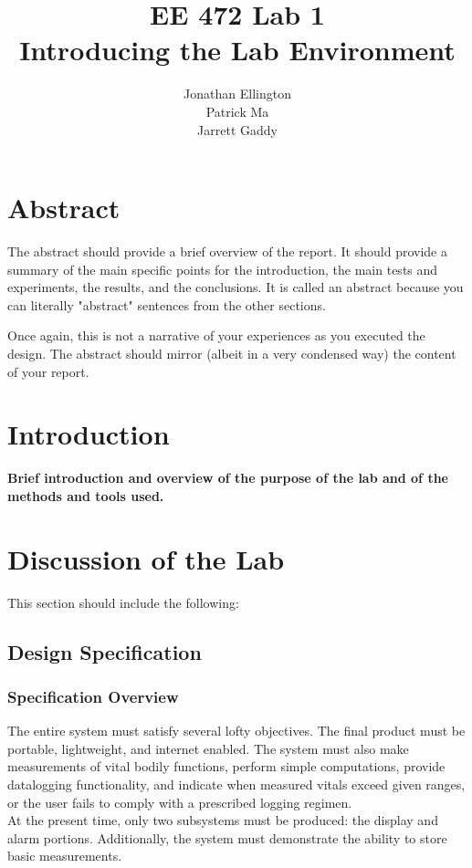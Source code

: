 \documentclass[12pt]{article} %
\title{\TitleFont EE 472 Lab 1 \\ Introducing the Lab Environment \vfill }
\author{\AuthorFont Jonathan Ellington \\ Patrick Ma \\ Jarrett Gaddy}
\date{}
\begin{document}
\maketitle
\thispagestyle{empty}
\pagebreak
\tableofcontents
\listoftables
\listoffigures
\thispagestyle{empty}
\pagebreak
\setcounter{page}{1}

\section{Abstract}
The abstract should provide a brief overview of the report.  It should provide a summary of the main specific points for the introduction, the main tests and experiments, the results, and the conclusions. It is called an abstract because you can literally "abstract" sentences from the other sections. 

Once again, this is not a narrative of your experiences as you executed the design.  The abstract should mirror (albeit in a very condensed way) the content of your report.

\section{Introduction}
\textbf{Brief introduction and overview of the purpose of the lab and of the methods and tools used.}

\section{Discussion of the Lab}

This section should include the following:

\subsection{Design Specification\label{sec:designSpec}}

\subsubsection{Specification Overview}
The entire system must satisfy several lofty objectives. The final product must be portable, lightweight, and internet enabled. The system must also make measurements of vital bodily functions, perform simple computations, provide datalogging functionality, and indicate when measured vitals exceed given ranges, or the user fails to comply with a prescribed logging regimen. \\
At the present time, only two subsystems must be produced: the display and alarm portions. Additionally, the system must demonstrate the ability to store basic measurements. \\
\end{document}
